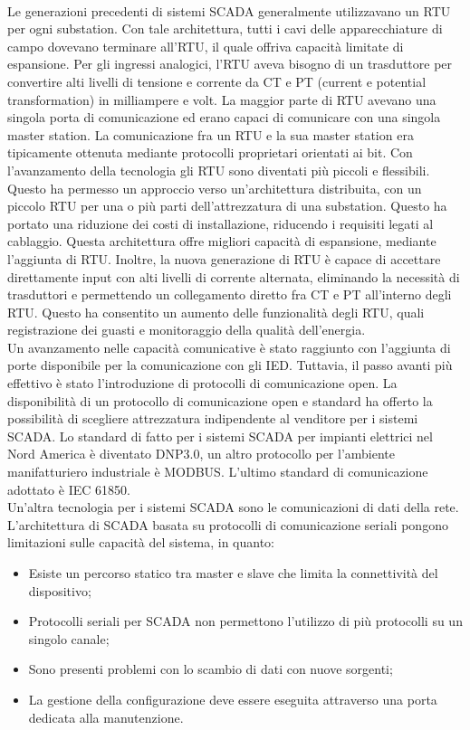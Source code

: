 \paragraph{} Le generazioni precedenti di sistemi SCADA generalmente utilizzavano un RTU per ogni substation. Con tale architettura, tutti i cavi delle apparecchiature di campo dovevano terminare all'RTU, il quale offriva capacità limitate di espansione. Per gli ingressi analogici, l'RTU aveva bisogno di un trasduttore per convertire alti livelli di tensione e corrente da CT e PT (current e potential transformation) in milliampere e volt. La maggior parte di RTU avevano una singola porta di comunicazione ed erano capaci di comunicare con una singola master station. La comunicazione fra un RTU e la sua master station era tipicamente ottenuta mediante protocolli proprietari orientati ai bit. Con l'avanzamento della tecnologia gli RTU sono diventati più piccoli e flessibili. Questo ha permesso un approccio verso un'architettura distribuita, con un piccolo RTU per una o più parti dell'attrezzatura di una substation. Questo ha portato una riduzione dei costi di installazione, riducendo i requisiti legati al cablaggio. Questa architettura offre migliori capacità di espansione, mediante l'aggiunta di RTU. Inoltre, la nuova generazione di RTU è capace di accettare direttamente input con alti livelli di corrente alternata, eliminando la necessità di trasduttori e permettendo un collegamento diretto fra CT e PT all'interno degli RTU. Questo ha consentito un aumento delle funzionalità degli RTU, quali registrazione dei guasti e monitoraggio della qualità dell'energia.
\\
Un avanzamento nelle capacità comunicative è stato raggiunto con l'aggiunta di porte disponibile per la comunicazione con gli IED. Tuttavia, il passo avanti più effettivo è stato l'introduzione di protocolli di comunicazione open. La disponibilità di un protocollo di comunicazione open e standard ha offerto la possibilità di scegliere attrezzatura indipendente al venditore per i sistemi SCADA. Lo standard di fatto per i sistemi SCADA per impianti elettrici nel Nord America è diventato DNP3.0, un altro protocollo per l'ambiente manifatturiero industriale è MODBUS. L'ultimo standard di comunicazione adottato è IEC 61850. 
\\
Un'altra tecnologia per i sistemi SCADA sono le comunicazioni di dati della rete. L'architettura di SCADA basata su protocolli di comunicazione seriali pongono  limitazioni sulle capacità del sistema, in quanto:
\begin{itemize}
	\item Esiste un percorso statico tra master e slave che limita la connettività del dispositivo;
	\item Protocolli seriali per SCADA non permettono l'utilizzo di più protocolli su un singolo canale;
	\item Sono presenti problemi con lo scambio di dati con nuove sorgenti;
	\item La gestione della configurazione deve essere eseguita attraverso una porta dedicata alla manutenzione.
\end{itemize}   

